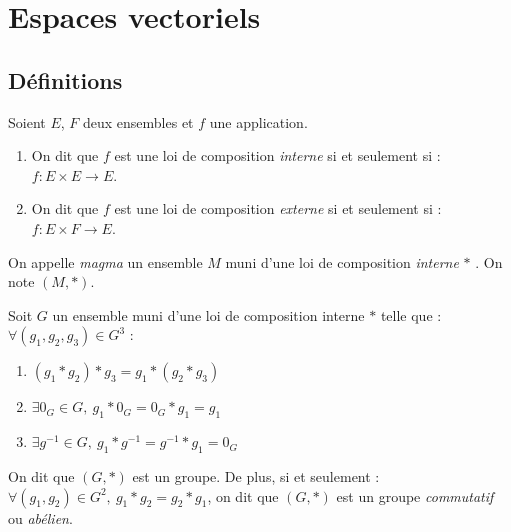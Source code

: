 \chapter{Espaces vectoriels}\label{chap:espaces_vectoriels}

\section{Définitions}
\begin{definition}
	Soient $E$, $F$ deux ensembles et $f$ une application.
	\begin{enumerate}
		\item On dit que $f$ est une loi de composition \emph{interne} si et seulement si : $f : E \times E \to E$.
		\item On dit que $f$ est une loi de composition \emph{externe} si et seulement si : $f : E \times F \to E$.
	\end{enumerate}
\end{definition}

\begin{definition}[Magma]
	On appelle \emph{magma} un ensemble $M$ muni d'une loi de composition \emph{interne} \og $*$ \fg. On note $(M, *)$.
\end{definition}

\begin{definition}[Groupe]
	Soit $G$ un ensemble muni d'une loi de composition interne \og $*$ \fg telle que :
    $\forall (g_1, g_2, g_3) \in G^3$ :
    \begin{multicols}{2}
    	\begin{enumerate}
    		\item $(g_1 * g_2) * g_3 = g_1 * (g_2 * g_3)$
    		\item $\exists 0_G \in G,\ g_1 * 0_G = 0_G * g_1 = g_1$
    		\item $\exists g^{-1} \in G,\ g_1 * g^{-1} = g^{-1} * g_1 = 0_G$
    	\end{enumerate}
    \end{multicols}
    \noindent On dit que $(G, *)$ est un groupe. De plus, si et seulement :
    $\forall (g_1, g_2) \in G^2,\ g_1 * g_2 = g_2* g_1$, on dit que $(G, *)$ est un groupe \emph{commutatif} ou \emph{abélien}.
\end{definition}

